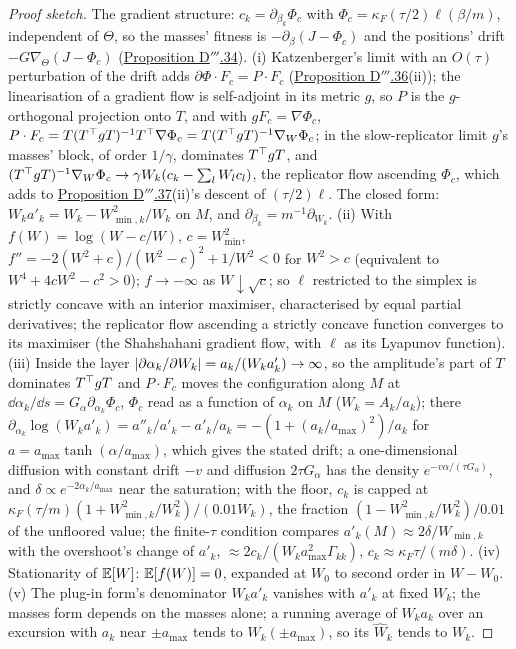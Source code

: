 \begin{proof}[Proof sketch]
The gradient structure: $c_k = \partial_{\beta_k}\Phi_c$ with $\Phi_c = \kappa_F(\tau/2)\ell(\beta/m)$, independent of
$\Theta$, so the masses' fitness is $-\partial_\beta(J - \Phi_c)$ and the positions' drift
$-G\nabla_\Theta(J - \Phi_c)$ (\hyperref[res:thmDppp:34]{Proposition D$'''$.34}). (i) Katzenberger's limit with an
$O(\tau)$ perturbation of the drift adds $\partial\Phi\cdot F_c = P\cdot F_c$
(\hyperref[res:thmDppp:36]{Proposition D$'''$.36}(ii)); the linearisation of a gradient flow is self-adjoint in its
metric $g$, so $P$ is the $g$-orthogonal projection onto $T$, and with $gF_c = \nabla\Phi_c$,
$P\cdot F_c = T(T^\top gT)^{-1}T^\top\nabla\Phi_c = T(T^\top gT)^{-1}\nabla_W\Phi_c$; in the slow-replicator limit $g$'s
masses' block, of order $1/\gamma$, dominates $T^\top gT$, and
$(T^\top gT)^{-1}\nabla_W\Phi_c\to\gamma W_k(c_k - \sum_lW_lc_l)$, the replicator flow ascending $\Phi_c$, which adds to
\hyperref[res:thmDppp:37]{Proposition D$'''$.37}(ii)'s descent of $(\tau/2)\ell$. The closed form:
$W_ka'_k = W_k - W_{\min,k}^2/W_k$ on $M$, and $\partial_{\beta_k} = m^{-1}\partial_{W_k}$. (ii) With
$f(W) = \log(W - c/W)$, $c = W_{\min}^2$, $f'' = -2(W^2 + c)/(W^2 - c)^2 + 1/W^2 < 0$ for $W^2 > c$ (equivalent to
$W^4 + 4cW^2 - c^2 > 0$); $f\to-\infty$ as $W\downarrow\sqrt c$; so $\ell$ restricted to the simplex is strictly
concave with an interior maximiser, characterised by equal partial derivatives; the replicator flow ascending a
strictly concave function converges to its maximiser (the Shahshahani gradient flow, with $\ell$ as its Lyapunov
function). (iii) Inside the layer $\lvert \partial\alpha_k/\partial W_k\rvert = a_k/(W_ka'_k)\to\infty$, so the amplitude's
part of $T$ dominates $T^\top gT$ and $P\cdot F_c$ moves the configuration along $M$ at
$\dd\alpha_k/\dd s = G_\alpha\partial_{\alpha_k}\Phi_c$, $\Phi_c$ read as a function of $\alpha_k$ on $M$
($W_k = A_k/a_k$); there $\partial_{\alpha_k}\log(W_ka'_k) = a''_k/a'_k - a'_k/a_k = -(1 + (a_k/a_{\max})^2)/a_k$ for
$a = a_{\max}\tanh(\alpha/a_{\max})$, which gives the stated drift; a one-dimensional diffusion with constant drift
$-v$ and diffusion $2\tau G_\alpha$ has the density $e^{-v\alpha/(\tau G_\alpha)}$, and
$\delta\propto e^{-2\alpha_k/a_{\max}}$ near the saturation; with the floor, $c_k$ is capped at
$\kappa_F(\tau/m)(1 + W_{\min,k}^2/W_k^2)/(0.01W_k)$, the fraction $(1 - W_{\min,k}^2/W_k^2)/0.01$ of the unfloored
value; the finite-$\tau$ condition compares $a'_k(M)\approx2\delta/W_{\min,k}$ with the overshoot's change of $a'_k$,
$\approx2c_k/(W_ka_{\max}^2\Gamma_{kk})$, $c_k\approx\kappa_F\tau/(m\delta)$. (iv) Stationarity of $\mathbb{E}[W]$:
$\mathbb{E}[f(W)] = 0$, expanded at $W_0$ to second order in $W - W_0$. (v) The plug-in form's denominator $W_ka'_k$ vanishes
with $a'_k$ at fixed $W_k$; the masses form depends on the masses alone; a running average of $W_ka_k$ over an
excursion with $a_k$ near $\pm a_{\max}$ tends to $W_k(\pm a_{\max})$, so its $\hat W_k$ tends to $W_k$.
\end{proof}
